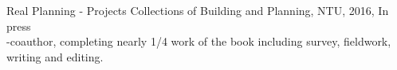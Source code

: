 \begin{cventries}
  \cventry
    {}
    {}
    {}
    {}
    {
      \begin{cvitems}
        \item{Real Planning - Projects Collections of Building and Planning, NTU, 2016, In press} \\ %
        	-coauthor, completing nearly 1/4 work of the book including survey, fieldwork, writing and editing. 
      \end{cvitems}
    }

\end{cventries}
